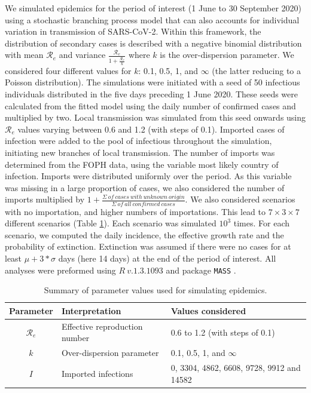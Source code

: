 \documentclass[10pt, a4paper, twoside]{article}
\begin{document}
\begin{multicols}{2}
We simulated epidemics for the period of interest (1 June to 30 September 2020) using a stochastic branching process model that can also accounts for individual variation in transmission of SARS-CoV-2.
Within this framework, the distribution of secondary cases is described with a negative binomial distribution with mean $\mathcal{R}_e$ and variance $\frac{\mathcal{R}_e}{1+\frac{\mathcal{R}_e}{k}}$ where $k$ is the over-dispersion parameter. 
We considered four different values for $k$: 0.1, 0.5, 1, and  $\infty$ (the latter reducing to a Poisson distribution). 
The simulations were initiated with a seed of 50 infectious individuals distributed in the five days preceding 1 June 2020.
These seeds were calculated from the fitted model using the daily number of confirmed cases and multiplied by two.
Local transmission was simulated from this seed onwards using $\mathcal{R}_e$ values varying between 0.6 and 1.2 (with steps of 0.1).
Imported cases of infection were added to the pool of infectious throughout the simulation, initiating new branches of local transmission.
The number of imports was determined from the FOPH data, using the variable most likely country of infection.
Imports were distributed uniformly over the period.
As this variable was missing in a large proportion of cases, we also considered the number of imports multiplied by $1+ \frac{\Sigma ~of ~cases ~with ~unknown ~origin }{\Sigma ~of ~all ~confirmed ~cases}$. 
We also considered scenarios with no importation, and higher numbers of importations.
This lead to $7 \times 3 \times 7 $ different scenarios (Table \ref{t1}).
Each scenario was simulated $10^3$ times.
For each scenario, we computed the daily incidence, the effective growth rate and the probability of extinction.
Extinction was assumed if there were no cases for at least $\mu + 3*\sigma$ days (here 14 days) at the end of the period of interest.
All analyses were preformed using $R ~v.1.3.1093$ and package \texttt{MASS} .\cite{r_core_team_r_2020,venables_modern_2002}

\end{multicols}
\begin{table}
	\centering
\caption{Summary of parameter values used for simulating epidemics.}
\label{t1}
\begin{tabular}{cll}
	\hline
	Parameter & Interpretation & Values considered\\
	\hline
	$\mathcal{R}_e$ & Effective reproduction number & 0.6 to 1.2 (with steps of 0.1) \\
	$k$ & Over-dispersion parameter & 0.1, 0.5, 1, and  $\infty$ \\
	$I$ & Imported infections & 0, 3304, 4862, 6608, 9728, 9912 and 14582  \\
	\hline
\end{tabular}
\end{table}
\end{document}
